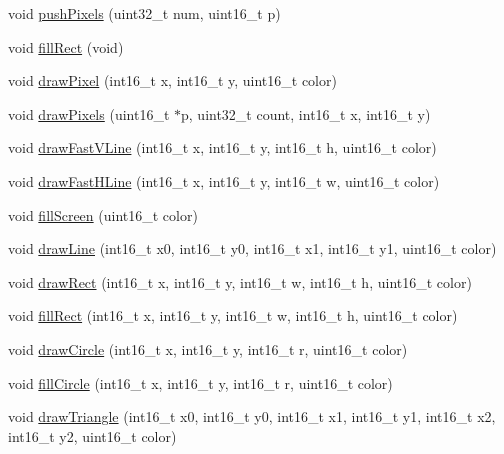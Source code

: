 \begin{DoxyCompactItemize}
\item 
void \mbox{\hyperlink{class_adafruit___r_a8875_a56ee5cb7ee6909234b33d43d6ccad151}{push\+Pixels}} (uint32\+\_\+t num, uint16\+\_\+t p)
\item 
void \mbox{\hyperlink{class_adafruit___r_a8875_a01abba90019ca97eb0fc4658ad8aa944}{fill\+Rect}} (void)
\item 
void \mbox{\hyperlink{class_adafruit___r_a8875_a0823c85097d1383ceb8b0b11c9c44e8d}{draw\+Pixel}} (int16\+\_\+t x, int16\+\_\+t y, uint16\+\_\+t color)
\item 
void \mbox{\hyperlink{class_adafruit___r_a8875_ac6e86e03d8fe244195d903e32f269d7d}{draw\+Pixels}} (uint16\+\_\+t $\ast$p, uint32\+\_\+t count, int16\+\_\+t x, int16\+\_\+t y)
\item 
void \mbox{\hyperlink{class_adafruit___r_a8875_a220058cb510ac11f659b002e17cedaac}{draw\+Fast\+V\+Line}} (int16\+\_\+t x, int16\+\_\+t y, int16\+\_\+t h, uint16\+\_\+t color)
\item 
void \mbox{\hyperlink{class_adafruit___r_a8875_abc5c2d8c1cc17dcfdfd8029808bc9331}{draw\+Fast\+H\+Line}} (int16\+\_\+t x, int16\+\_\+t y, int16\+\_\+t w, uint16\+\_\+t color)
\item 
void \mbox{\hyperlink{class_adafruit___r_a8875_a2d39c15526a273d77ddb94f4f0b9a853}{fill\+Screen}} (uint16\+\_\+t color)
\item 
void \mbox{\hyperlink{class_adafruit___r_a8875_a1c5cb990bb00eb69dcd0e32fda9c0452}{draw\+Line}} (int16\+\_\+t x0, int16\+\_\+t y0, int16\+\_\+t x1, int16\+\_\+t y1, uint16\+\_\+t color)
\item 
void \mbox{\hyperlink{class_adafruit___r_a8875_a6e283f1de1daba12df14119497ca3102}{draw\+Rect}} (int16\+\_\+t x, int16\+\_\+t y, int16\+\_\+t w, int16\+\_\+t h, uint16\+\_\+t color)
\item 
void \mbox{\hyperlink{class_adafruit___r_a8875_aacf19cbab442f7b0a95e0f8fc1173c53}{fill\+Rect}} (int16\+\_\+t x, int16\+\_\+t y, int16\+\_\+t w, int16\+\_\+t h, uint16\+\_\+t color)
\item 
void \mbox{\hyperlink{class_adafruit___r_a8875_a94d9aa8fb911d93213e575476a720bb0}{draw\+Circle}} (int16\+\_\+t x, int16\+\_\+t y, int16\+\_\+t r, uint16\+\_\+t color)
\item 
void \mbox{\hyperlink{class_adafruit___r_a8875_a23ff6ea833ab315fc6e5ca0ada3c5f9d}{fill\+Circle}} (int16\+\_\+t x, int16\+\_\+t y, int16\+\_\+t r, uint16\+\_\+t color)
\item 
void \mbox{\hyperlink{class_adafruit___r_a8875_ada0ac44d2948040577edecbc6b638d01}{draw\+Triangle}} (int16\+\_\+t x0, int16\+\_\+t y0, int16\+\_\+t x1, int16\+\_\+t y1, int16\+\_\+t x2, int16\+\_\+t y2, uint16\+\_\+t color)

\end{DoxyCompactItemize}
